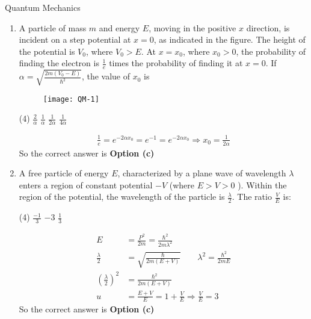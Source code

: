 \begin{abox}
	Quantum Mechanics
	\end{abox}
\begin{enumerate}
	\item A particle of mass $m$ and energy $E$, moving in the positive $x$ direction, is incident on a step potential at $x=0$, as indicated in the figure. The height of the potential is $V_{0}$, where $V_{0}>E$. At $x=x_{0}$, where $x_{0}>0$, the probability of finding the electron is $\frac{1}{e}$ times the probability of finding it at $x=0$.
	If $\alpha=\sqrt{\frac{2 m\left(V_{0}-E\right)}{\hbar^{2}}}$, the value of $x_{0}$ is
	\begin{figure}[H]
		\centering
		\texttt{[image: QM-1]}
	\end{figure}
	 \begin{tasks}(4)
		\task[\textbf{a.}]$\frac{2}{\alpha}$
		\task[\textbf{b.}]$\frac{1}{\alpha}$
		\task[\textbf{c.}]$\frac{1}{2 \alpha}$
		\task[\textbf{d.}] $\frac{1}{4 \alpha}$
	\end{tasks}
\begin{answer}
	$$
	\begin{aligned}
	\frac{1}{e}=e^{-2 \alpha x_{0}}=e^{-1}=e^{-2 \alpha x_{0}} \Rightarrow x_{0}=\frac{1}{2 \alpha}
\end{aligned}
$$
So the correct answer is \textbf{Option (c)}
\end{answer}
	\item A free particle of energy $E$, characterized by a plane wave of wavelength $\lambda$ enters a region of constant potential $-V$ (where $E>V>0$ ). Within the region of the potential, the wavelength of the particle is $\frac{\lambda}{2}$. The ratio $\frac{V}{E}$ is:
	 \begin{tasks}(4)
		\task[\textbf{a.}]$\frac{-1}{3}$
		\task[\textbf{b.}] $-3$
		\task[\textbf{d.}]  $\frac{1}{3}$
	\end{tasks}
\begin{answer}
	$$
	\begin{aligned}
	E&=\frac{P^{2}}{2 m}=\frac{\hbar^{2}}{2 m \lambda^{2}}\\
	\frac{\lambda}{2}&=\sqrt{\frac{\hbar}{2 m(E+V)}}\qquad \lambda^{2}=\frac{\hbar^{2}}{2 m E}\\
	\left(\frac{\lambda}{2}\right)^{2}&=\frac{\hbar^{2}}{2 m(E+V)}\\
	u&=\frac{E+V}{E}=1+\frac{V}{E} \Rightarrow \frac{V}{E}=3
\end{aligned}
$$
So the correct answer is \textbf{Option (c)}

\end{answer}
\end{enumerate}
